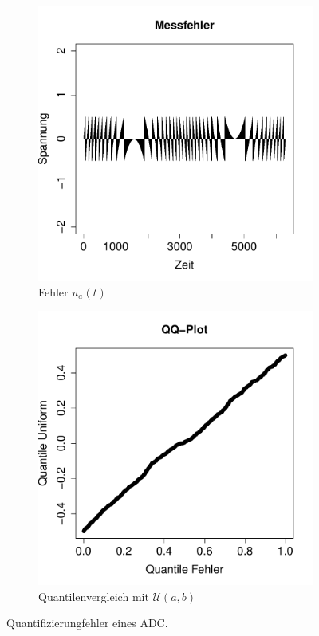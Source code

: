 \begin{figure}[h!]
\begin{subfigure}[b]{0.48\textwidth}
\includegraphics{verteilungen-054}
\caption{Fehler $u_a(t)$}
\end{subfigure}
\begin{subfigure}[b]{0.48\textwidth}
\includegraphics{verteilungen-055}
\caption{Quantilenvergleich mit $\mathcal{U}(a,b)$}
\label{fig:adc-d}
\end{subfigure}
\caption{Quantifizierungfehler eines ADC.}
\label{fig:adc}
\end{figure}

